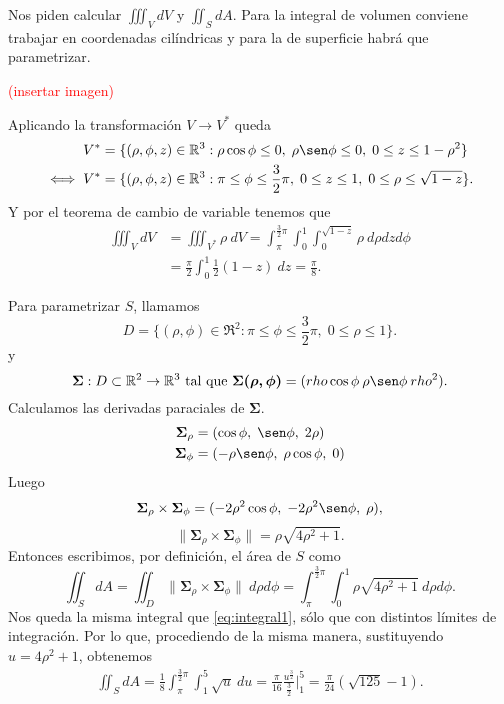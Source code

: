 \begin{solution}
    Nos piden calcular $\iiint_V dV$ y $\iint_S dA$. Para la
    integral de volumen conviene trabajar en coordenadas
    cil\'indricas y para la de superficie habr\'a que parametrizar.

    \textcolor{red}{(insertar imagen)}

    Aplicando la transformaci\'on $V \rightarrow V^*$ queda
    \begin{align*}
        V^*      & =\{(\rho, \phi, z)\in\Re^3: \rho\cos\phi \leq 0,\;
        \rho\sen\phi \leq 0,\; 0 \leq z \leq 1-\rho^2\}               \\
        \iff V^* & =\{(\rho, \phi, z)\in\Re^3: \pi \leq \phi \leq
        \frac{3}{2}\pi,\; 0 \leq z \leq 1,\; 0 \leq \rho \leq
        \sqrt{1-z} \}.
    \end{align*}
    Y por el teorema de cambio de variable tenemos que
    \begin{align*}
        \iiint_V dV & = \iiint_{V^*} \rho\:dV = \int_\pi^{\frac{3}{2}\pi}
        \int_0^1\int_0^{\sqrt{1-z}}\rho\:d\rho dz d\phi                   \\
                    & =\frac{\pi}{2}\int_0^1\frac{1}{2}(1-z)\:dz =
        \frac{\pi}{8}.
    \end{align*}

    Para parametrizar $S$, llamamos
    \[
        D = \{(\rho, \phi)\in\Re^2 : \pi\leq\phi\leq\frac{3}{2}\pi,\;
        0\leq\rho\leq 1\}.
    \]
    y
    \[
        \boldsymbol{\Sigma}:D\subset\Re^2\rightarrow\Re^3\text{ tal que }
        \boldsymbol{\Sigma(\rho,\phi)}=(rho\cos\phi\:\rho\sen\phi\:rho^2).
    \]
    Calculamos las derivadas paraciales de $\boldsymbol{\Sigma}$.
    \begin{align*}
        \boldsymbol{\Sigma}_{\rho}&=(\cos \phi,\;\sen \phi,\; 2\rho)\\
        \boldsymbol{\Sigma}_\phi&=(  -\rho \sen \phi,\;\rho \cos \phi,\;0)
        \end{align*}
    Luego
    $$
        \boldsymbol{\Sigma}_{\rho} \times\boldsymbol{\Sigma}_\phi =
        (-2\rho^2 \cos\phi  , \;-2\rho^2 \sen \phi, \;\rho),
    $$ 
    $$\|\boldsymbol{\Sigma}_{\rho} \times\boldsymbol{\Sigma}_\phi\|
        = \rho\sqrt{4\rho^2+1}.
    $$ 
    Entonces escribimos, por definici\'on, el \'area de $S$ como
    \[
        \iint_S dA = \iint_D \| \boldsymbol{\Sigma}_{\rho}
        \times\boldsymbol{\Sigma}_\phi\|\:d\rho d\phi = \int_\pi^{\frac{3}{2}\pi}\int_0^1\rho\sqrt{4\rho^2+1}\:d\rho d\phi.
    \]
    Nos queda la misma integral que \eqref{eq:integral1}, s\'olo que con distintos l\'imites de integraci\'on. Por lo que, procediendo de la misma manera, sustituyendo $u = 4\rho^2+1$, obtenemos
    \begin{gather*}
        \iint_S dA =
        \frac{1}{8}\int_\pi^{\frac{3}{2}\pi}\int_1^5\sqrt{u}\:du =
        \frac{\pi}{16}\frac{u^{\frac{3}{2}}}{\frac{3}{2}}\Bigg\lvert_1^5 =
        \frac{\pi}{24}(\sqrt{125}-1).
    \end{gather*}
\end{solution}

